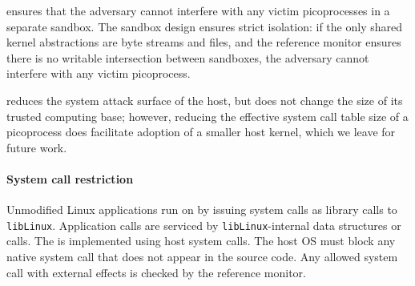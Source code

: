 \graphene{} ensures that %
the adversary cannot interfere with any victim picoprocesses
in a separate sandbox.  
The \graphene{} sandbox design ensures strict isolation: 
if the only shared kernel abstractions are byte streams and files, 
and the reference monitor ensures
there is no writable intersection between sandboxes,
the adversary cannot interfere with any victim picoprocess.



\graphene{} reduces the system attack surface of the host, but does not change the size of its
trusted computing base; however, reducing the effective system call table
size of a picoprocess does facilitate adoption of a smaller host kernel,
which we leave for future work.

\paragraph{System call restriction}

Unmodified Linux applications run on \graphene{} by issuing 
system calls as library calls to {\tt libLinux}.
Application calls are serviced by {\tt libLinux}-internal data structures
or \pal{} calls.
The \pal{} is implemented using \hostsyscallnum{} host system calls.
The host OS must block any 
native system call that 
does not appear in the \pal{} source code.
Any allowed system call with external effects is checked by 
the reference monitor.
 





